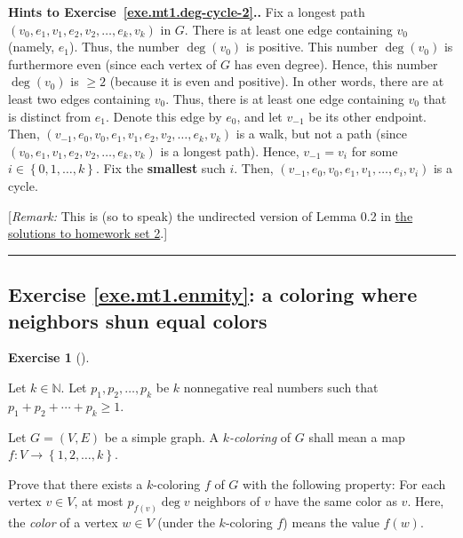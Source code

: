 \documentclass[numbers=enddot,12pt,final,onecolumn,notitlepage]{scrartcl}%
\newcounter{exer}
\theoremstyle{definition}
\newtheorem{exmp}[exer]{Exercise}
\newenvironment{exercise}[1][]
{\begin{exmp}[#1]\begin{leftbar}}
{\end{leftbar}\end{exmp}}
\newenvironment{proof}[1][Proof]{\noindent\textbf{#1.} }{\ \rule{0.5em}{0.5em}}
\newcommand{\NN}{\mathbb{N}}
\newcommand{\set}[1]{\left\{ #1 \right\}}
\newcommand{\tup}[1]{\left( #1 \right)}
\begin{document}
\begin{proof}[Hints to Exercise~\ref{exe.mt1.deg-cycle-2}.]
Fix a longest path
$\tup{v_0, e_1, v_1, e_2, v_2, \ldots, e_k, v_k}$ in $G$.
There is at least one edge containing $v_0$ (namely, $e_1$).
Thus, the number $\deg \tup{v_0}$ is positive.
This number $\deg \tup{v_0}$ is furthermore even (since each
vertex of $G$ has even degree).
Hence, this number $\deg \tup{v_0}$ is $\geq 2$
(because it is even and positive).
In other words, there are at least two edges containing $v_0$.
Thus, there is at least one edge containing $v_0$ that is distinct
from $e_1$.
Denote this edge by $e_0$, and let $v_{-1}$ be its other endpoint.
Then, $\tup{v_{-1}, e_0, v_0, e_1, v_1, e_2, v_2, \ldots, e_k, v_k}$
is a walk, but not a path (since
$\tup{v_0, e_1, v_1, e_2, v_2, \ldots, e_k, v_k}$ is a longest path).
Hence, $v_{-1} = v_i$ for some $i \in \set{0, 1, \ldots, k}$.
Fix the \textbf{smallest} such $i$.
Then,
$\tup{v_{-1}, e_0, v_0, e_1, v_1, \ldots, e_i, v_i}$ is a cycle.

[\textit{Remark:} This is (so to speak) the undirected version of
Lemma 0.2 in
\href{http://www-users.math.umn.edu/~dgrinber/5707s17/hw2s.pdf}{the solutions to homework set 2}.]
\end{proof}

\subsection{Exercise \ref{exe.mt1.enmity}: a coloring where neighbors
shun equal colors}

\begin{exercise} \label{exe.mt1.enmity}
Let $k \in \NN$. Let $p_1, p_2, \ldots, p_k$ be $k$ nonnegative
real numbers such that $p_1 + p_2 + \cdots + p_k \geq 1$.

Let $G = \tup{V, E}$ be a simple graph. A \textit{$k$-coloring} of $G$
shall mean a map $f : V \to \set{1, 2, \ldots, k}$.

Prove that there exists a
$k$-coloring $f$ of $G$ with the following property: For each vertex
$v \in V$, at most $p_{f\tup{v}} \deg v$ neighbors of $v$ have the
same color
as $v$. Here, the \textit{color} of a vertex $w \in V$ (under the
$k$-coloring $f$) means the value $f\tup{w}$.
\end{exercise}
\end{document}

